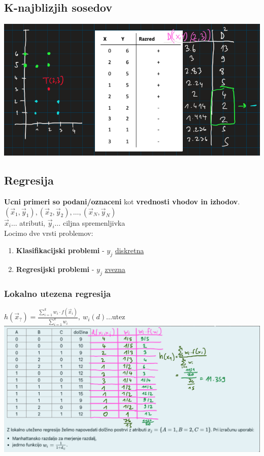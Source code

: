 \subsection{K-najblizjih sosedov}
\includegraphics[width=\columnwidth]{./images/knn.png}

\subsection{Regresija}
\textbf{Ucni primeri so podani/oznaceni} kot \textbf{vrednosti vhodov in izhodov}.\\
$(\vec{x}_1,\vec{y}_1),(\vec{x}_2,\vec{y}_2),\dots,(\vec{x}_N,\vec{y}_N)$\\
$\vec{x}_i\dots$ atributi, $\vec{y}_i\dots$ ciljna spremenljivka\\
Locimo dve vrsti problemov:
\begin{enumerate}[leftmargin=*,noitemsep,topsep=0pt,partopsep=0pt]
    \item \textbf{Klasifikacijski problemi} - $y_j$ \underline{diskretna} 
    \item \textbf{Regresijski problemi} - $y_j$ \underline{zvezna} 
\end{enumerate}

\subsubsection{Lokalno utezena regresija}
$h(\vec{x}_?) = \frac{\sum\limits_{i=1}^k w_i\cdot f(\vec{x}_i)}{\sum\limits_{i=1}^k w_i}, \: w_i(d) ... \text{utez}$\\
\includegraphics[width=\columnwidth]{./images/lokalno-utezena-regresija.png}

